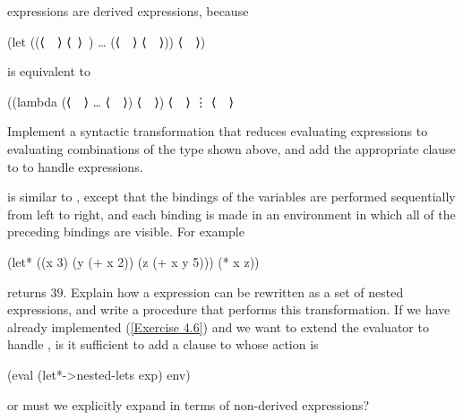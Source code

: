 \begin{exercise}
	\label{Exercise 4.6}
	 expressions are derived expressions, because
	\begin{scheme}
	  (let ((⟨~~⟩ ⟨~⟩~) … (⟨~~⟩ ⟨~~⟩))
	    ⟨~~⟩)
	\end{scheme}
	is equivalent to
	\begin{scheme}
	  ((lambda (⟨~~⟩ … ⟨~~⟩)
	     ⟨~~⟩)
	     ⟨~~⟩
	     ⋮
	     ⟨~~⟩
	\end{scheme}
	Implement a syntactic transformation  that reduces evaluating  expressions to evaluating combinations of the type shown above, and add the appropriate clause to  to handle \code{let}
	expressions.
\end{exercise}



\begin{exercise}
	\label{Exercise 4.7}
	 is similar to , except that the bindings of the  variables are performed sequentially from left to right, and each binding is made in an environment in which all of the preceding bindings are visible.
	For example
	\begin{scheme}
	  (let* ((x 3)  (y (+ x 2))  (z (+ x y 5)))
	    (* x z))
	\end{scheme}
	returns \( 39 \).
	Explain how a  expression can be rewritten as a set of nested  expressions, and write a procedure  that performs this transformation.
	If we have already implemented  (\cref{Exercise 4.6}) and we want to extend the evaluator to handle , is it sufficient to add a clause to  whose action is
	\begin{scheme}
	  (eval (let*->nested-lets exp) env)
	\end{scheme}
	or must we explicitly expand  in terms of non-derived expressions?
\end{exercise}



